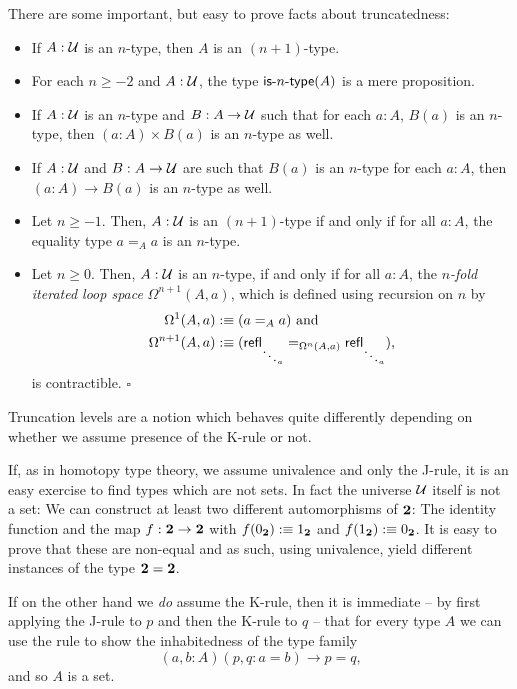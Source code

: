 There are some important, but easy to prove facts about truncatedness:
\begin{lemma}
\begin{itemize}
\item If $A : \mathcal{U}$ is an $n$-type, then $A$ is an $(n+1)$-type.
\item For each $n \geq -2$ and $A : \mathcal{U}$, the type $\mathsf{is}\mbox{-}{n}\mbox{-}\mathsf{type}(A)$ is a mere
proposition.
\item If $A : \mathcal{U}$ is an $n$-type and $B : A \to \mathcal{U}$ such that for each $a : A$,
$B(a)$ is an $n$-type, then $(a : A) \times B(a)$ is an $n$-type as well.
\item If $A : \mathcal{U}$ and $B : A \to \mathcal{U}$ are such that $B(a)$ is an $n$-type for each
$a : A$, then $(a : A) \to B(a)$ is an $n$-type as well.
\item Let $n \geq -1$. Then, $A : \mathcal{U}$ is an $(n+1)$-type if and only if for all $a : A$,
the equality type $a =_A a$ is an $n$-type.
\item Let $n \geq 0$. Then, $A : \mathcal{U}$ is an $n$-type, if and only if for all $a : A$,
the \emph{$n$-fold iterated loop space} $\Omega^{n+1}(A, a)$, which is defined using
recursion on $n$ by
\begin{align*}
\Omega^1(A, a) &:\equiv (a =_A a) \text{ and}\\
\Omega^{n+1}(A, a) &:\equiv (\mathsf{refl}_{\ddots_a} =_{\Omega^n(A,a)} \mathsf{refl}_{\ddots_a}) \text{,}
\end{align*}
is contractible. \hfill $\square$
\end{itemize}
\end{lemma}

\begin{remark}\label{rmk:tt-uip}
Truncation levels are a notion which behaves quite differently
depending on whether we assume presence of the K-rule or not.

If, as in homotopy type theory, we assume univalence and only the J-rule,
it is an easy exercise to find types which are not sets.
In fact the universe $\mathcal{U}$ itself is not a set:
We can construct
at least two different automorphisms of $\mathbf{2}$: The identity function
and the map $f : \mathbf{2} \to \mathbf{2}$ with $f(0_{\mathbf{2}}) :\equiv 1_{\mathbf{2}}$
and $f(1_{\mathbf{2}}) :\equiv 0_{\mathbf{2}}$.
It is easy to prove that these are non-equal and as such, using univalence,
yield different instances of the type $\mathbf{2} = \mathbf{2}$.

If on the other hand we \emph{do} assume the K-rule, then it is immediate
-- by first applying the J-rule to $p$ and then the K-rule to $q$ -- that
for every type $A$ we can use the rule to show the inhabitedness of the
type family
\begin{equation*}
(a, b : A) (p, q : a = b) \to p = q \text{,}
\end{equation*}
and so $A$ is a set.
\end{remark}


